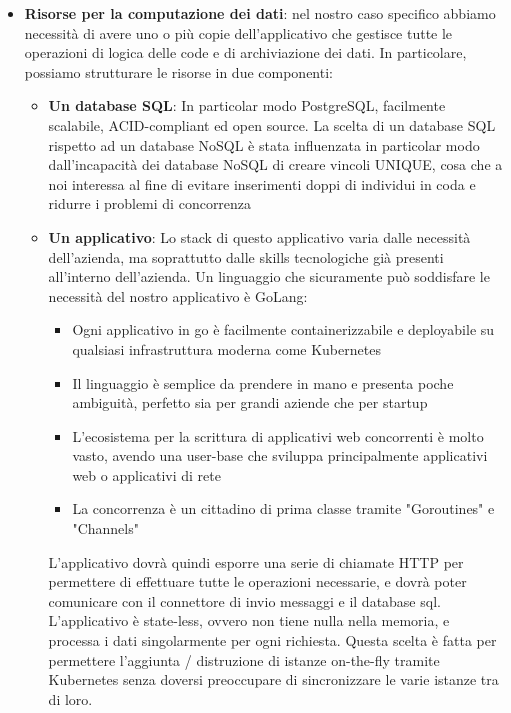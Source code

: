 \documentclass[a4paper, titlepage, 12pt, openright, twoside]{book}
\begin{document}
\begin{itemize}
	\item \textbf{Risorse per la computazione dei dati}: nel nostro caso specifico abbiamo necessità di avere uno o più copie dell'applicativo che gestisce tutte le operazioni
				 di logica delle code e di archiviazione dei dati. In particolare, possiamo strutturare le risorse in due componenti:
				 \begin{itemize}
				 	\item \textbf{Un database SQL}: In particolar modo PostgreSQL, facilmente scalabile, ACID-compliant ed open source. La scelta di un database SQL rispetto ad
				 				 un database NoSQL è stata influenzata in particolar modo dall'incapacità dei database NoSQL di creare vincoli UNIQUE, cosa che a noi interessa
				 				 al fine di evitare inserimenti doppi di individui in coda e ridurre i problemi di concorrenza
				 	\item \textbf{Un applicativo}: Lo stack di questo applicativo varia dalle necessità dell'azienda, ma soprattutto dalle skills tecnologiche già presenti
				 				 all'interno dell'azienda. Un linguaggio che sicuramente può soddisfare le necessità del nostro applicativo è GoLang:
				 				 \begin{itemize}
				 				 	\item Ogni applicativo in go è facilmente containerizzabile e deployabile su qualsiasi infrastruttura moderna come Kubernetes
				 				 	\item Il linguaggio è semplice da prendere in mano e presenta poche ambiguità, perfetto sia per grandi aziende che per startup
				 				 	\item L'ecosistema per la scrittura di applicativi web concorrenti è molto vasto, avendo una user-base che sviluppa principalmente 
				 				 		  applicativi web o applicativi di rete
				 				 	\item La concorrenza è un cittadino di prima classe tramite "Goroutines" e "Channels"
				 				 \end{itemize}
				 				 L'applicativo dovrà quindi esporre una serie di chiamate HTTP per permettere di effettuare tutte le operazioni necessarie,
				 				 e dovrà poter comunicare con il connettore di invio messaggi e il database sql. L'applicativo è state-less, ovvero non tiene nulla nella memoria,
				 				 e processa i dati singolarmente per ogni richiesta. Questa scelta è fatta per permettere l'aggiunta / distruzione di istanze on-the-fly tramite
				 				 Kubernetes senza doversi preoccupare di sincronizzare le varie istanze tra di loro.
				 \end{itemize}
	

\end{itemize}
\end{document}
